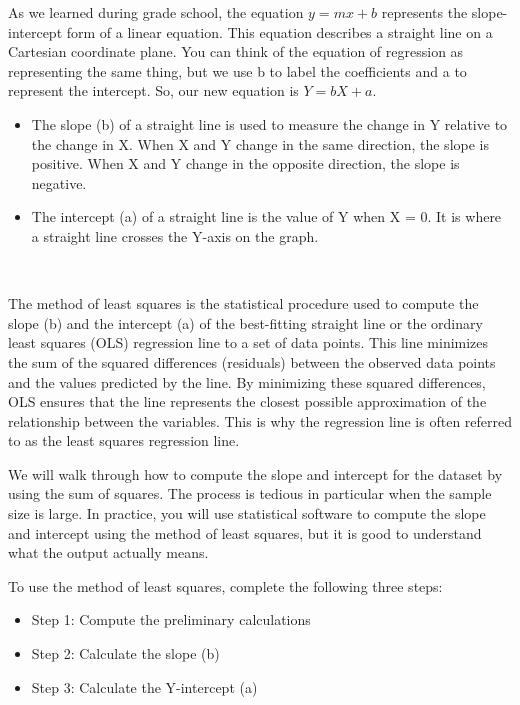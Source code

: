 \documentclass[
  letterpaper,
  DIV=11,
  numbers=noendperiod]{scrreprt}
\begin{document}
As we learned during grade school, the equation \(y = mx+b\) represents
the slope-intercept form of a linear equation. This equation describes a
straight line on a Cartesian coordinate plane. You can think of the
equation of regression as representing the same thing, but we use b to
label the coefficients and a to represent the intercept. So, our new
equation is \(Y = bX + a\).\,

\begin{itemize}
\item
  The slope (b) of a straight line is used to measure the change in Y
  relative to the change in X. When X and Y change in the same
  direction, the slope is positive. When X and Y change in the opposite
  direction, the slope is negative.\,\,
\item
  The intercept (a) of a straight line is the value of Y when X = 0. It
  is where a straight line crosses the Y-axis on the graph.\,\,
\end{itemize}

\,

The method of least squares is the statistical procedure used to compute
the slope (b) and the intercept (a) of the best-fitting straight line or
the ordinary least squares (OLS) regression line to a set of data
points. This line minimizes the sum of the squared differences
(residuals) between the observed data points and the values predicted by
the line. By minimizing these squared differences, OLS ensures that the
line represents the closest possible approximation of the relationship
between the variables. This is why the regression line is often referred
to as the least squares regression line.

We will walk through how to compute the slope and intercept for the
dataset by using the sum of squares. The process is tedious in
particular when the sample size is large. In practice, you will use
statistical software to compute the slope and intercept using the method
of least squares, but it is good to understand what the output actually
means.\,

To use the method of least squares, complete the following three
steps:\,\,

\begin{itemize}
\item
  Step 1: Compute the preliminary calculations\,\,
\item
  Step 2: Calculate the slope (b)\,\,
\item
  Step 3: Calculate the Y-intercept (a)\,\,
\end{itemize}
\end{document}
